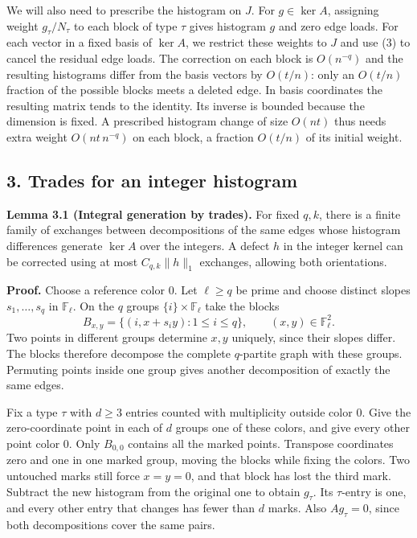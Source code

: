 \documentclass[english,11pt,a4paper]{article}
\begin{document}
We will also need to prescribe the histogram on \(J\). For \(g\in\ker A\), assigning weight \(g_\tau/N_\tau\) to each block of type \(\tau\) gives histogram \(g\) and zero edge loads. For each vector in a fixed basis of \(\ker A\), we restrict these weights to \(J\) and use (3) to cancel the residual edge loads. The correction on each block is \(O(n^{-q})\) and the resulting histograms differ from the basis vectors by \(O(t/n)\): only an \(O(t/n)\) fraction of the possible blocks meets a deleted edge. In basis coordinates the resulting matrix tends to the identity. Its inverse is bounded because the dimension is fixed. A prescribed histogram change of size \(O(nt)\) thus needs extra weight \(O(nt\,n^{-q})\) on each block, a fraction \(O(t/n)\) of its initial weight.

\subsection{3. Trades for an integer histogram}\label{trades-for-an-integer-histogram}

\textbf{Lemma 3.1 (Integral generation by trades).} For fixed \(q,k\), there is a finite family of exchanges between decompositions of the same edges whose histogram differences generate \(\ker A\) over the integers. A defect \(h\) in the integer kernel can be corrected using at most \(C_{q,k}\|h\|_1\) exchanges, allowing both orientations.

\textbf{Proof.} Choose a reference color \(0\). Let \(\ell\ge q\) be prime and choose distinct slopes \(s_1,\ldots,s_q\) in \(\mathbb F_\ell\). On the \(q\) groups \(\{i\}\times\mathbb F_\ell\) take the blocks \[B_{x,y}=\{(i,x+s_i y):1\le i\le q\},\qquad (x,y)\in\mathbb F_\ell^2 .\] Two points in different groups determine \(x,y\) uniquely, since their slopes differ. The blocks therefore decompose the complete \(q\)-partite graph with these groups. Permuting points inside one group gives another decomposition of exactly the same edges.

Fix a type \(\tau\) with \(d\ge3\) entries counted with multiplicity outside color \(0\). Give the zero-coordinate point in each of \(d\) groups one of these colors, and give every other point color \(0\). Only \(B_{0,0}\) contains all the marked points. Transpose coordinates zero and one in one marked group, moving the blocks while fixing the colors. Two untouched marks still force \(x=y=0\), and that block has lost the third mark. Subtract the new histogram from the original one to obtain \(g_\tau\). Its \(\tau\)-entry is one, and every other entry that changes has fewer than \(d\) marks. Also \(Ag_\tau=0\), since both decompositions cover the same pairs.
\end{document}
